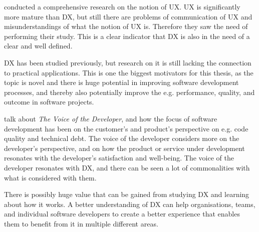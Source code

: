 \documentclass[english, 12pt, a4paper, sci, utf8, a-1b, online]{aaltothesis}
\begin{document}
\textcite{understanding-ux} conducted a comprehensive research on the notion of UX. UX is significantly more mature than DX, but still there are problems of communication of UX and misunderstandings of what the notion of UX is. Therefore they saw the need of performing their study. This is a clear indicator that DX is also in the need of a clear and well defined.

DX has been studied previously, but research on it is still lacking the connection to practical applications. This is one the biggest motivators for this thesis, as the topic is novel and there is huge potential in improving software development processes, and thereby also potentially improve the e.g. performance, quality, and outcome in software projects.

\textcite{voice-of-the-developer} talk about \textit{The Voice of the Developer}, and how the focus of software development has been on the customer's and product's perspective on e.g. code quality and technical debt. The voice of the developer considers more on the developer's perspective, and on how the product or service under development resonates with the developer's satisfaction and well-being. The voice of the developer resonates with DX, and there can be seen a lot of commonalities with what is considered with them.

There is possibly huge value that can be gained from studying DX and learning about how it works. A better understanding of DX can help organisations, teams, and individual software developers to create a better experience that enables them to benefit from it in multiple different areas.

\end{document}
